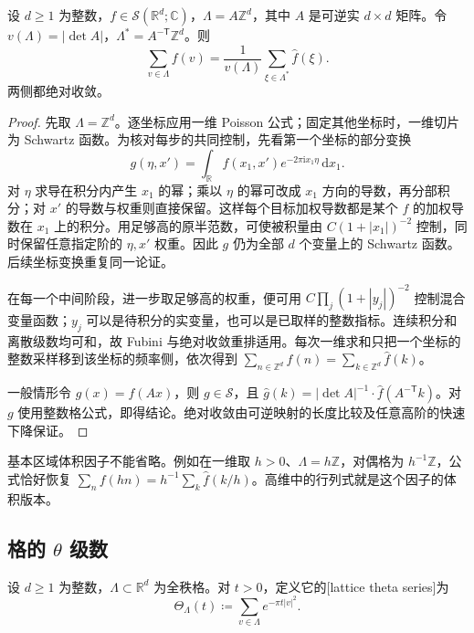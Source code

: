 \begin{theorem}\label{b2:thm:06-lattice-poisson}
设 \(d\geq1\) 为整数，\(f\in\mathcal S(\mathbb R^d;\mathbb C)\)，\(\Lambda=A\mathbb Z^d\)，其中 \(A\) 是可逆实 \(d\times d\) 矩阵。令 \(v(\Lambda)=|\det A|\)，\(\Lambda^*=A^{-\mathsf T}\mathbb Z^d\)。则
\[
 \sum_{v\in\Lambda}f(v)
 =\dfrac1{v(\Lambda)}\sum_{\xi\in\Lambda^*}\widehat f(\xi).
\]
两侧都绝对收敛。
\end{theorem}
\begin{proof}
先取 \(\Lambda=\mathbb Z^d\)。逐坐标应用一维 Poisson 公式；固定其他坐标时，一维切片为 Schwartz 函数。为核对每步的共同控制，先看第一个坐标的部分变换
\[
 g(\eta,x')=\int_{\mathbb R}f(x_1,x')e^{-2\pi\mathrm{i}x_1\eta}\,\mathrm{d}x_1.
\]
对 \(\eta\) 求导在积分内产生 \(x_1\) 的幂；乘以 \(\eta\) 的幂可改成 \(x_1\) 方向的导数，再分部积分；对 \(x'\) 的导数与权重则直接保留。这样每个目标加权导数都是某个 \(f\) 的加权导数在 \(x_1\) 上的积分。用足够高的原半范数，可使被积量由 \(C(1+|x_1|)^{-2}\) 控制，同时保留任意指定阶的 \(\eta,x'\) 权重。因此 \(g\) 仍为全部 \(d\) 个变量上的 Schwartz 函数。后续坐标变换重复同一论证。

在每一个中间阶段，进一步取足够高的权重，便可用 \(C\prod_j(1+|y_j|)^{-2}\) 控制混合变量函数；\(y_j\) 可以是待积分的实变量，也可以是已取样的整数指标。连续积分和离散级数均可和，故 Fubini 与绝对收敛重排适用。每次一维求和只把一个坐标的整数采样移到该坐标的频率侧，依次得到 \(\sum_{n\in\mathbb Z^d}f(n)=\sum_{k\in\mathbb Z^d}\widehat f(k)\)。

一般情形令 \(g(x)=f(Ax)\)，则 \(g\in\mathcal S\)，且 \(\widehat g(k)=|\det A|^{-1}\cdot\widehat f(A^{-\mathsf T}k)\)。对 \(g\) 使用整数格公式，即得结论。绝对收敛由可逆映射的长度比较及任意高阶的快速下降保证。
\end{proof}

基本区域体积因子不能省略。例如在一维取 \(h>0\)、\(\Lambda=h\mathbb Z\)，对偶格为 \(h^{-1}\mathbb Z\)，公式恰好恢复 \(\sum_nf(hn)=h^{-1}\sum_k\widehat f(k/h)\)。高维中的行列式就是这个因子的体积版本。

\subsection{格的 \texorpdfstring{\(\theta\)}{\AnalysisPdfTheta} 级数}
\label{b2:subsec:060403}

\begin{definition}\label{b2:def:06-lattice-theta}
设 \(d\geq1\) 为整数，\(\Lambda\subset\mathbb R^d\) 为全秩格。对 \(t>0\)，定义它的[lattice theta series]为
\[
 \Theta_\Lambda(t)\coloneqq\sum_{v\in\Lambda}e^{-\pi t|v|^2}.
\]
\end{definition}

